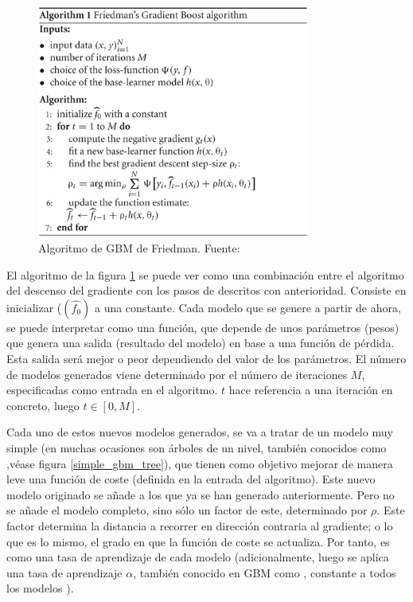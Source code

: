 \begin{figure}[H]
    \centering
    \includegraphics[width = 0.8\textwidth]{imgs/GBM_algm.png}
    \caption{Algoritmo de GBM de Friedman. \scriptsize{Fuente: \parencite{GBMtutorial}}}
    \label{GBM_algm}
\end{figure}

El algoritmo de la figura \ref{GBM_algm} se puede ver como una combinación entre el algoritmo del descenso del gradiente con  los pasos de  descritos con anterioridad. Consiste en inicializar ($(\widehat{f_0})$ a una constante. Cada modelo que se genere a partir de ahora, se puede interpretar como una función, que depende de unos parámetros (pesos) que genera una salida (resultado del modelo) en base a una función de pérdida\fnm. Esta salida será mejor o peor dependiendo del valor de los parámetros. El número de modelos generados viene determinado por el número de iteraciones $M$, especificadas como entrada en el algoritmo. $t$ hace referencia a una iteración en concreto, luego  $t \in [0, M]$.

Cada uno de estos nuevos modelos generados, se va a tratar de un modelo muy simple (en muchas ocasiones son árboles de un nivel, también conocidos como ,véase figura \ref{simple_gbm_tree}), que tienen como objetivo mejorar de manera leve una función de coste (definida en la entrada del algoritmo). Este nuevo modelo originado se añade a los que ya se han generado anteriormente. Pero no se añade el modelo completo, sino sólo un factor de este, determinado por $\rho$. Este factor determina la distancia a recorrer en dirección contraria al gradiente; o lo que es lo mismo, el grado en que la función de coste se actualiza. Por tanto, es como una tasa de aprendizaje de cada modelo (adicionalmente, luego se aplica una tasa de aprendizaje $\alpha$, también conocido en GBM como , constante a todos los modelos \parencite{GBM}).


